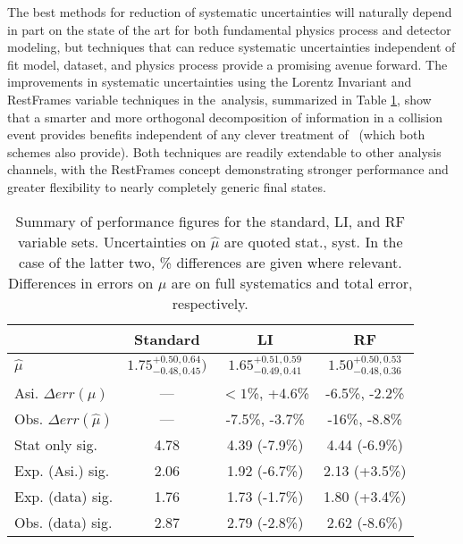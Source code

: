 The best methods for reduction of systematic uncertainties will naturally depend in part on the state of the art for both fundamental physics process and detector modeling, but techniques that can reduce systematic uncertainties independent of fit model, dataset, and physics process provide a promising avenue forward.  The improvements in systematic uncertainties using the Lorentz Invariant and RestFrames variable techniques in the \ZH\,analysis, summarized in Table \ref{tab:kahuna2}, show that a smarter and more orthogonal decomposition of information in a collision event provides benefits independent of any clever treatment of \met\, (which both schemes also provide).  Both techniques are readily extendable to other analysis channels, with the RestFrames concept demonstrating stronger performance and greater flexibility to nearly completely generic final states.

\begin{table}[!htbp]\captionsetup{justification=centering}
\begin{center}
\begin{tabular}{lccc}
\hline\hline
 & Standard &LI &RF\\
\hline
$\hat{\mu}$ & $1.75^{+0.50,0.64}_{-0.48,0.45})$ & $1.65^{+0.51,0.59}_{-0.49,0.41}$ & $1.50^{+0.50,0.53}_{-0.48,0.36}$\\
Asi. $\Delta err\left(\mu\right)$ &  --- & $<1$\%, +4.6\% & -6.5\%, -2.2\%\\
Obs. $\Delta err\left(\hat{\mu}\right)$ &  --- & -7.5\%, -3.7\% & -16\%, -8.8\%\\
\hline
Stat only sig. & 4.78 & 4.39 (-7.9\%) & 4.44 (-6.9\%)\\
Exp. (Asi.) sig. & 2.06 & 1.92 (-6.7\%) & 2.13 (+3.5\%)\\
Exp. (data) sig. & 1.76 & 1.73 (-1.7\%) & 1.80 (+3.4\%)\\
Obs. (data) sig. & 2.87 & 2.79 (-2.8\%) & 2.62 (-8.6\%)\\
\hline\hline
\end{tabular}
\end{center}
\caption{Summary of performance figures for the standard, LI, and RF variable sets.  Uncertainties on $\hat{\mu}$ are quoted stat., syst.  In the case of the latter two, \% differences are given where relevant.  Differences in errors on $\mu$ are on full systematics and total error, respectively.}
\label{tab:kahuna2}
\end{table}

